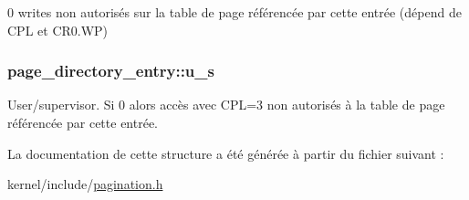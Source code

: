 0 writes non autorisés sur la table de page référencée par cette entrée (dépend de C\-P\-L et C\-R0.\-W\-P) \hypertarget{structpage__directory__entry_a6e87e7efc2fbbbd5f8f7fd2e0cd09b3f}{
\subsubsection[{u\-\_\-s}]{ page\-\_\-directory\-\_\-entry\-::u\-\_\-s}}\label{structpage__directory__entry_a6e87e7efc2fbbbd5f8f7fd2e0cd09b3f}
User/supervisor. Si 0 alors accès avec C\-P\-L=3 non autorisés à la table de page référencée par cette entrée. 

La documentation de cette structure a été générée à partir du fichier suivant \-:\begin{DoxyCompactItemize}
\item 
kernel/include/\hyperlink{pagination_8h}{pagination.\-h}\end{DoxyCompactItemize}
